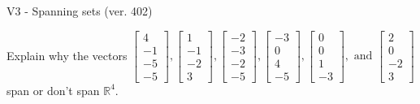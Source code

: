 \begin{exercise}
  \begin{exerciseTitle}V3 - Spanning sets (ver. 402)\end{exerciseTitle}
  \begin{exerciseStatement}
    Explain why the vectors \(\left[\begin{array}{r}
4 \\
-1 \\
-5 \\
-5
\end{array}\right] , \left[\begin{array}{r}
1 \\
-1 \\
-2 \\
3
\end{array}\right] , \left[\begin{array}{r}
-2 \\
-3 \\
-2 \\
-5
\end{array}\right] , \left[\begin{array}{r}
-3 \\
0 \\
4 \\
-5
\end{array}\right] , \left[\begin{array}{r}
0 \\
0 \\
1 \\
-3
\end{array}\right] , \text{ and } \left[\begin{array}{r}
2 \\
0 \\
-2 \\
3
\end{array}\right]\) span or don't span \(\mathbb{R}^4\). 
	



\end{exerciseStatement}
\end{exercise}
